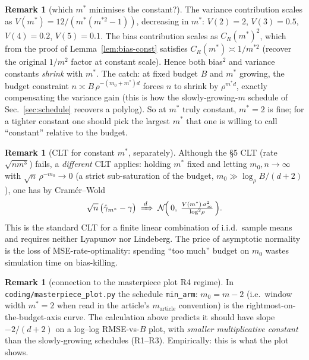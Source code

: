 \documentclass[11pt]{article}
\theoremstyle{plain}
\theoremstyle{definition}
\newtheorem{remark}[theorem]{Remark}
\begin{document}
\begin{remark}[which $m^{\ast}$ minimises the constant?]
The variance contribution scales as
$V(m^{\ast}) = 12/(m^{\ast}(m^{\ast 2}-1))$, decreasing in $m^{\ast}$:
$V(2) = 2$, $V(3) = 0.5$, $V(4) = 0.2$, $V(5) = 0.1$.
The bias contribution scales as $C_R(m^{\ast})^{2}$, which from the
proof of Lemma~\ref{lem:bias-const} satisfies $C_R(m^{\ast}) \asymp
1/m^{\ast 2}$ (recover the original $1/m^{2}$ factor at constant
scale). Hence both bias$^{2}$ and variance constants \emph{shrink}
with $m^{\ast}$. The catch: at fixed budget $B$ and $m^{\ast}$
growing, the budget constraint
$n \asymp B\,\rho^{-(m_0+m^{\ast})d}$ forces $n$ to shrink by
$\rho^{m^{\ast}d}$, exactly compensating the variance gain (this is
how the slowly-growing-$m$ schedule of Sec.~\ref{sec:schedule}
recovers a polylog). So at $m^{\ast}$ truly constant, $m^{\ast}=2$
is fine; for a tighter constant one should pick the largest $m^{\ast}$
that one is willing to call ``constant'' relative to the budget.
\end{remark}

\begin{remark}[CLT for constant $m^{\ast}$, separately]
Although the §5 CLT (rate $\sqrt{nm^{3}}$) fails, a \emph{different}
CLT applies: holding $m^{\ast}$ fixed and letting $m_0,n\to\infty$
with $\sqrt{n}\,\rho^{-m_0}\to 0$ (a strict sub-saturation of the
budget, $m_0 \gg \log_\rho B/(d+2)$), one has by Cramér--Wold
\[
  \sqrt{n}\,\bigl(\hat\gamma_{m^{\ast}} - \gamma\bigr)
  \;\xRightarrow{\,d\,}\;
  \mathcal{N}\!\Bigl(\,0,\;\tfrac{V(m^{\ast})\,\sigma_\infty^{2}}{\log^{2}\!\rho}\,\Bigr).
\]
This is the standard CLT for a finite linear combination of i.i.d.\
sample means and requires neither Lyapunov nor Lindeberg. The price
of asymptotic normality is the loss of MSE-rate-optimality: spending
``too much'' budget on $m_0$ wastes simulation time on bias-killing.
\end{remark}

\begin{remark}[connection to the masterpiece plot R4 regime]
In \texttt{coding/masterpiece\_plot.py} the schedule
\texttt{min\_arm}: $m_0 = m - 2$ (i.e.\ window width
$m^{\ast} = 2$ when read in the article's $m_{\text{article}}$
convention) is the rightmost-on-the-budget-axis curve. The
calculation above predicts it should have slope $-2/(d+2)$ on a
log--log RMSE-vs-$B$ plot, with \emph{smaller multiplicative constant}
than the slowly-growing schedules (R1--R3). Empirically: this is what
the plot shows.
\end{remark}
\end{document}
